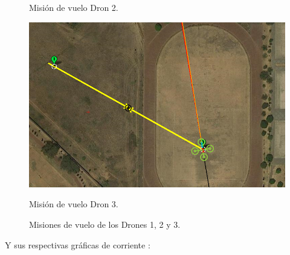 \begin{figure}[h!]
\begin{minipage}{0.3\linewidth}
        \caption{Misión de vuelo Dron 2.}
        \label{fig:subfig2}
    \end{minipage}
    \hfill
    \begin{minipage}{0.3\linewidth}
        \centering
        \includegraphics[width=1.1\linewidth]{imagenes/esq_2_3.png}
        \caption{Misión de vuelo Dron 3.}
        \label{fig:subfig3}
    \end{minipage}
    \caption{Misiones de vuelo de los Drones 1, 2 y 3.}
    \label{fig:enter-label}
\end{figure}

Y sus respectivas gráficas de corriente :

